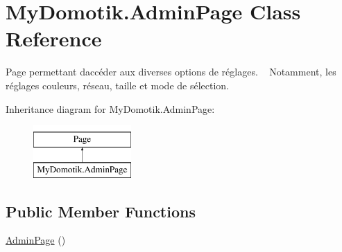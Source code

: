 \hypertarget{class_my_domotik_1_1_admin_page}{}\section{My\+Domotik.\+Admin\+Page Class Reference}
\label{class_my_domotik_1_1_admin_page}


Page permettant d\textquotesingle{}accéder aux diverses options de réglages. ~\newline
Notamment, les réglages couleurs, réseau, taille et mode de sélection.  


Inheritance diagram for My\+Domotik.\+Admin\+Page\+:\begin{figure}[H]
\begin{center}
\leavevmode
\includegraphics[height=2.000000cm]{class_my_domotik_1_1_admin_page}
\end{center}
\end{figure}
\subsection*{Public Member Functions}
\begin{DoxyCompactItemize}
\item 
\hyperlink{class_my_domotik_1_1_admin_page_a7db176cfea2e26b4bd2fb3fc26b9be02}{Admin\+Page} ()
\end{DoxyCompactItemize}
